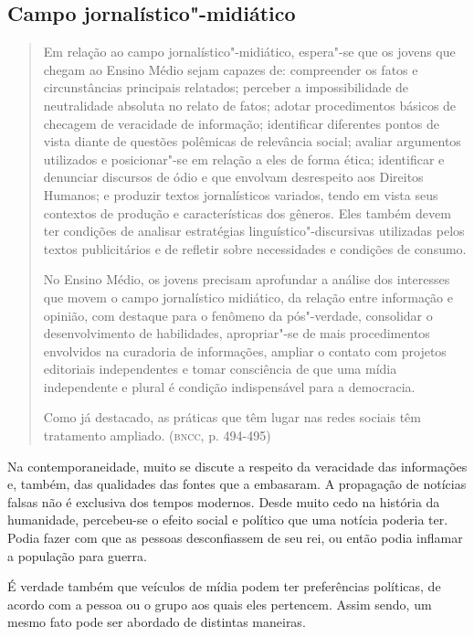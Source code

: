 \documentclass[12pt]{extarticle}
\begin{document}
\subsection{Campo jornalístico"-midiático}

\begin{quote}
Em relação ao campo jornalístico"-midiático, espera"-se que os jovens
que chegam ao Ensino Médio sejam capazes de: compreender os fatos e
circunstâncias principais relatados; perceber a impossibilidade de
neutralidade absoluta no relato de fatos; adotar procedimentos básicos
de checagem de veracidade de informação; identificar diferentes pontos
de vista diante de questões polêmicas de relevância social; avaliar
argumentos utilizados e posicionar"-se em relação a eles de forma ética;
identificar e denunciar discursos de ódio e que envolvam desrespeito aos
Direitos Humanos; e produzir textos jornalísticos variados, tendo em
vista seus contextos de produção e características dos gêneros. Eles
também devem ter condições de analisar estratégias
linguístico"-discursivas utilizadas pelos textos publicitários e de
refletir sobre necessidades e condições de consumo.

No Ensino Médio, os jovens precisam aprofundar a análise dos interesses
que movem o campo jornalístico midiático, da relação entre informação e
opinião, com destaque para o fenômeno da pós"-verdade, consolidar o
desenvolvimento de habilidades, apropriar"-se de mais procedimentos
envolvidos na curadoria de informações, ampliar o contato com projetos
editoriais independentes e tomar consciência de que uma mídia
independente e plural é condição indispensável para a democracia.

Como já destacado, as práticas que têm lugar nas redes sociais têm
tratamento ampliado. (\textsc{bncc}, p. 494-495)
\end{quote}

Na contemporaneidade, muito se discute a respeito da veracidade das
informações e, também, das qualidades das fontes que a embasaram. A
propagação de notícias falsas não é exclusiva dos tempos modernos.
Desde muito cedo na história da humanidade, percebeu-se o efeito
social e político que uma notícia poderia ter. Podia fazer com que as
pessoas desconfiassem de seu rei, ou então podia inflamar a população
para guerra.

É verdade também que veículos de mídia podem ter preferências políticas,
de acordo com a pessoa ou o grupo aos quais eles pertencem. Assim sendo,
um mesmo fato pode ser abordado de distintas maneiras.
\end{document}
